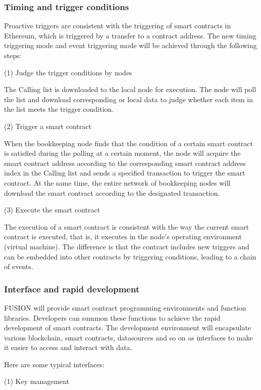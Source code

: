\documentclass[a4paper,12pt]{article}
\begin{document}
\subsubsection{Timing and trigger conditions}

Proactive triggers are consistent with the triggering of smart contracts in Ethereum, which is triggered by a transfer to a contract address. The new timing triggering mode and event triggering mode will be achieved through the following steps:

(1) Judge the trigger conditions by nodes

The Calling list is downloaded to the local node for execution. The node will poll the list and download corresponding or local data to judge whether each item in the list meets the trigger condition.

(2) Trigger a smart contract

When the bookkeeping node finds that the condition of a certain smart contract is satisfied during the polling at a certain moment, the node will acquire the smart contract address according to the corresponding smart contract address index in the Calling list and sends a specified transaction to trigger the smart contract. At the same time, the entire network of bookkeeping nodes will download the smart contract according to the designated transaction.

(3) Execute the smart contract

The execution of a smart contract is consistent with the way the current smart contract is executed, that is, it executes in the node's operating environment (virtual machine). The difference is that the contract includes new triggers and can be embedded into other contracts by triggering conditions, leading to a chain of events.


\subsubsection{Interface and rapid development}

FUSION will provide smart contract programming environments and function libraries. Developers can summon these functions to achieve the rapid development of smart contracts. The development environment will encapsulate various blockchain, smart contracts, datasources and so on as interfaces to make it easier to access and interact with data.

Here are some typical interfaces:

(1) Key management
\end{document}
